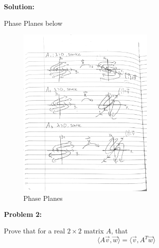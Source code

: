 \documentclass[12pt]{article}
\newenvironment{problem}[1]{
    \textbf{Problem #1:}
}{
    \rmfamily \vspace{1em}
}
\newenvironment{solution}{
    \textbf{Solution:}
    
}{
    
    \vspace{2em}
}
\begin{document}
\begin{solution}
Phase Planes below

    \begin{figure}[H]
            \centering
            \includegraphics[width=0.6\textwidth]{PhasePlane.pdf}
            \caption{Phase Planes}
        \label{fig:phase_diagram}
    \end{figure}

    
\end{solution}

\begin{problem}{2}
    Prove that for a real \(2 \times 2\) matrix \(A\), that
    \[
        \langle A\vec{v}, \vec{w} \rangle = \langle \vec{v}, A^T\vec{w} \rangle
    \]
\end{problem}
\end{document}
